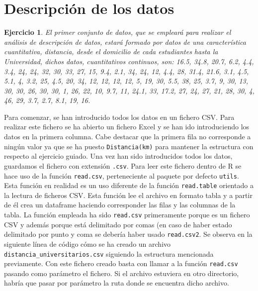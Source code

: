 \documentclass[12pt]{report}\usepackage[]{graphicx}\usepackage[dvipsnames]{xcolor}
\newtheorem{exercise}{Ejercicio}[section]
\begin{document}
		\section{Descripción de los datos}\label{sec:descrip_auto}
		
			\begin{exercise}
				El primer conjunto de datos, que se empleará para realizar el análisis de descripción de datos, estará formado por datos de una característica cuantitativa, distancia, desde el domicilio de cada estudiantes hasta la Universidad, dichos datos, cuantitativos continuos, son: 16.5, 34.8, 20.7, 6.2, 4.4, 3.4, 24, 24, 32, 30, 33, 27, 15, 9.4, 2.1, 34, 24, 12, 4.4, 28, 31.4, 21.6, 3.1, 4.5, 5.1, 4, 3.2, 25, 4.5, 20, 34, 12, 12, 12, 12, 5, 19, 30, 5.5, 38, 25, 3.7, 9, 30, 13, 30, 30, 26, 30, 30, 1, 26, 22, 10, 9.7, 11, 24.1, 33, 17.2, 27, 24, 27, 21, 28, 30, 4, 46, 29, 3.7, 2.7, 8.1, 19, 16.
			\end{exercise}
			
			Para comenzar, se han introducido todos los datos en un fichero CSV. Para realizar este fichero se ha abierto un fichero Excel y se han ido introduciendo los datos en la primera columna. Cabe destacar que la primera fila no corresponde a ningún valor ya que se ha puesto \texttt{Distancia(km)} para mantener la estructura con respecto al ejercicio guiado. Una vez han sido introducidos todos los datos, guardamos el fichero con extensión \texttt{.csv}. Para leer este fichero dentro de R se hace uso de la función \texttt{read.csv}, perteneciente al paquete por defecto \texttt{utils}. Esta función en realidad es un uso diferente de la función \texttt{read.table} orientado a la lectura de ficheros CSV. Esta función lee el archivo en formato tabla y a partir de él crea un dataframe haciendo corresponder las filas y las columnas de la tabla. La función empleada ha sido \texttt{read.csv} primeramente porque es un fichero CSV y además porque está delimitado por comas (en caso de haber estado delimitado por punto y coma se debería haber usado \texttt{read.csv2}. Se observa en la siguiente línea de código cómo se ha creado un archivo \texttt{distancia\_universitarios.csv} siguiendo la estructura mencionada previamente. Con este fichero creado basta con llamar a la función \texttt{read.csv} pasando como parámetro el fichero. Si el archivo estuviera en otro directorio, habría que pasar por parámetro la ruta donde se encuentra dicho archivo.
			
\end{document}
